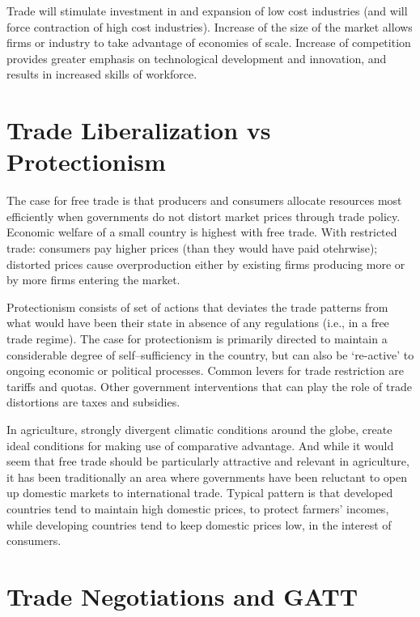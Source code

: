 \documentclass[]{book}
\begin{document}
Trade will stimulate investment in and expansion of low cost industries
(and will force contraction of high cost industries). Increase of the
size of the market allows firms or industry to take advantage of
economies of scale. Increase of competition provides greater emphasis on
technological development and innovation, and results in increased
skills of workforce.

\section{Trade Liberalization vs
Protectionism}\label{trade-liberalization-vs-protectionism}

The case for free trade is that producers and consumers allocate
resources most efficiently when governments do not distort market prices
through trade policy. Economic welfare of a small country is highest
with free trade. With restricted trade: consumers pay higher prices
(than they would have paid otehrwise); distorted prices cause
overproduction either by existing firms producing more or by more firms
entering the market.

Protectionism consists of set of actions that deviates the trade
patterns from what would have been their state in absence of any
regulations (i.e., in a free trade regime). The case for protectionism
is primarily directed to maintain a considerable degree of
self--sufficiency in the country, but can also be `re-active' to ongoing
economic or political processes. Common levers for trade restriction are
tariffs and quotas. Other government interventions that can play the
role of trade distortions are taxes and subsidies.

In agriculture, strongly divergent climatic conditions around the globe,
create ideal conditions for making use of comparative advantage. And
while it would seem that free trade should be particularly attractive
and relevant in agriculture, it has been traditionally an area where
governments have been reluctant to open up domestic markets to
international trade. Typical pattern is that developed countries tend to
maintain high domestic prices, to protect farmers' incomes, while
developing countries tend to keep domestic prices low, in the interest
of consumers.

\section{Trade Negotiations and GATT}\label{trade-negotiations-and-gatt}
\end{document}
